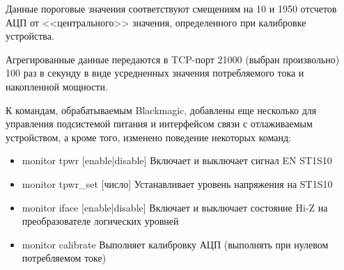Данные пороговые значения соответствуют смещениям на 10 и 1950 отсчетов АЦП 
от <<центрального>> значения, определенного при калибровке устройства.

Агрегированные данные передаются в TCP-порт 21000 (выбран произвольно) 100 раз в секунду в виде 
усредненных значения потребляемого тока и накопленной мощности.

К командам, обрабатываемым Blackmagic, добавлены еще несколько для управления подсистемой питания 
и интерфейсом связи с отлаживаемым устройством, а кроме того, изменено поведение некоторых команд:

\begin{itemize}
    \item monitor tpwr [enable|disable] Включает и выключает сигнал EN ST1S10
    \item monitor tpwr\_set [число] Устанавливает уровень напряжения на ST1S10
    \item monitor iface [enable|disable] Включает и выключает состояние Hi-Z на преобразователе 
    логических уровней
    \item monitor calibrate Выполняет калибровку АЦП (выполнять при нулевом потребляемом токе)
\end{itemize}

